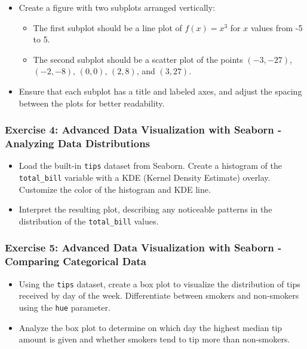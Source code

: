 \documentclass[
  letterpaper,
  DIV=11,
  numbers=noendperiod]{scrreprt}
\begin{document}
\begin{itemize}
\item
  Create a figure with two subplots arranged vertically:

  \begin{itemize}
  \item
    The first subplot should be a line plot of \(f(x) = x^3\) for \(x\)
    values from -5 to 5.
  \item
    The second subplot should be a scatter plot of the points
    \((-3, -27)\), \((-2, -8)\), \((0, 0)\), \((2, 8)\), and
    \((3, 27)\).
  \end{itemize}
\item
  Ensure that each subplot has a title and labeled axes, and adjust the
  spacing between the plots for better readability.
\end{itemize}

\hypertarget{exercise-4-advanced-data-visualization-with-seaborn---analyzing-data-distributions}{%
\subsubsection{Exercise 4: Advanced Data Visualization with Seaborn -
Analyzing Data
Distributions}\label{exercise-4-advanced-data-visualization-with-seaborn---analyzing-data-distributions}}

\begin{itemize}
\item
  Load the built-in \texttt{tips} dataset from Seaborn. Create a
  histogram of the \texttt{total\_bill} variable with a KDE (Kernel
  Density Estimate) overlay. Customize the color of the histogram and
  KDE line.
\item
  Interpret the resulting plot, describing any noticeable patterns in
  the distribution of the \texttt{total\_bill} values.
\end{itemize}

\hypertarget{exercise-5-advanced-data-visualization-with-seaborn---comparing-categorical-data}{%
\subsubsection{Exercise 5: Advanced Data Visualization with Seaborn -
Comparing Categorical
Data}\label{exercise-5-advanced-data-visualization-with-seaborn---comparing-categorical-data}}

\begin{itemize}
\item
  Using the \texttt{tips} dataset, create a box plot to visualize the
  distribution of tips received by day of the week. Differentiate
  between smokers and non-smokers using the \texttt{hue} parameter.
\item
  Analyze the box plot to determine on which day the highest median tip
  amount is given and whether smokers tend to tip more than non-smokers.
\end{itemize}
\end{document}

